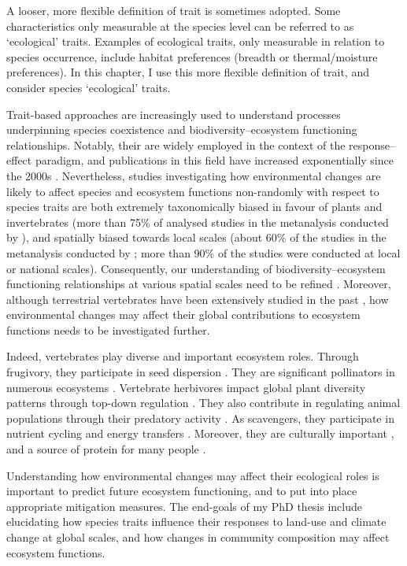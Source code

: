 A looser, more flexible definition of trait is sometimes adopted. Some characteristics only measurable at the species level can be referred to as `ecological' traits. Examples of ecological traits, only measurable in relation to species occurrence, include habitat preferences (breadth or thermal/moisture preferences). In this chapter, I use this more flexible definition of trait, and consider species `ecological' traits.

Trait-based approaches are increasingly used to understand processes underpinning species coexistence and biodiversity--ecosystem functioning relationships. Notably, their are widely employed in the context of the response--effect paradigm, and publications in this field have increased exponentially since the 2000s \citep{Hevia2017}. Nevertheless, studies investigating how environmental changes are likely to affect species and ecosystem functions non-randomly with respect to species traits are both extremely taxonomically biased in favour of plants and invertebrates (more than 75\% of analysed studies in the metanalysis conducted by \citet{Hevia2017}), and spatially biased towards local scales (about 60\% of the studies in the metanalysis conducted by \citet{Hevia2017}; more than 90\% of the studies were conducted at local or national scales). Consequently, our understanding of biodiversity--ecosystem functioning relationships at various spatial scales need to be refined \citep{Thompson2018, Isbell2018}. Moreover, although terrestrial vertebrates have been extensively studied in the past \citep{Titley2017}, how environmental changes may affect their global contributions to ecosystem functions needs to be investigated further. 

Indeed, vertebrates play diverse and important ecosystem roles. Through frugivory, they  participate in seed dispersion \citep{Wandrag2015, Mokany2014, McConkey2012}. They are significant pollinators in numerous ecosystems \citep{Ratto2018}. Vertebrate herbivores impact global plant diversity patterns through top-down regulation \citep{Lin2018, Zhang2018}. They also contribute in regulating animal populations through their predatory activity \citep{Paine2016, Luck2012, Letnic2012, Salo2010, Barber2010}. As scavengers, they participate in nutrient cycling and energy transfers \citep{Cunningham2018, Inger2016, Wilson2011}. Moreover, they are culturally important \citep{Hirons2016, Albert2018}, and a source of protein for many people \citep{Alves2018}.

Understanding how environmental changes may affect their ecological roles is important to predict future ecosystem functioning, and to put into place appropriate mitigation measures. The end-goals of my PhD thesis include elucidating how species traits influence their responses to land-use and climate change at global scales, and how changes in community composition may affect ecosystem functions.

